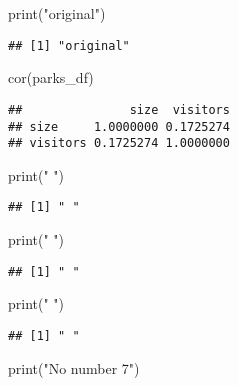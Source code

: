 \documentclass[
]{article}
\newenvironment{Shaded}{\begin{snugshade}}{\end{snugshade}}
\newcommand{\FunctionTok}[1]{\textcolor[rgb]{0.00,0.00,0.00}{#1}}
\newcommand{\NormalTok}[1]{#1}
\newcommand{\StringTok}[1]{\textcolor[rgb]{0.31,0.60,0.02}{#1}}
\begin{document}
\begin{Shaded}
\begin{Highlighting}[]
\FunctionTok{print}\NormalTok{(}\StringTok{"original"}\NormalTok{)}
\end{Highlighting}
\end{Shaded}

\begin{verbatim}
## [1] "original"
\end{verbatim}

\begin{Shaded}
\begin{Highlighting}[]
\FunctionTok{cor}\NormalTok{(parks\_df)}
\end{Highlighting}
\end{Shaded}

\begin{verbatim}
##               size  visitors
## size     1.0000000 0.1725274
## visitors 0.1725274 1.0000000
\end{verbatim}

\begin{Shaded}
\begin{Highlighting}[]
\FunctionTok{print}\NormalTok{(}\StringTok{" "}\NormalTok{)}
\end{Highlighting}
\end{Shaded}

\begin{verbatim}
## [1] " "
\end{verbatim}

\begin{Shaded}
\begin{Highlighting}[]
\FunctionTok{print}\NormalTok{(}\StringTok{" "}\NormalTok{)}
\end{Highlighting}
\end{Shaded}

\begin{verbatim}
## [1] " "
\end{verbatim}

\begin{Shaded}
\begin{Highlighting}[]
\FunctionTok{print}\NormalTok{(}\StringTok{" "}\NormalTok{)}
\end{Highlighting}
\end{Shaded}

\begin{verbatim}
## [1] " "
\end{verbatim}

\begin{Shaded}
\begin{Highlighting}[]
\FunctionTok{print}\NormalTok{(}\StringTok{"No number 7"}\NormalTok{)}
\end{Highlighting}
\end{Shaded}
\end{document}
